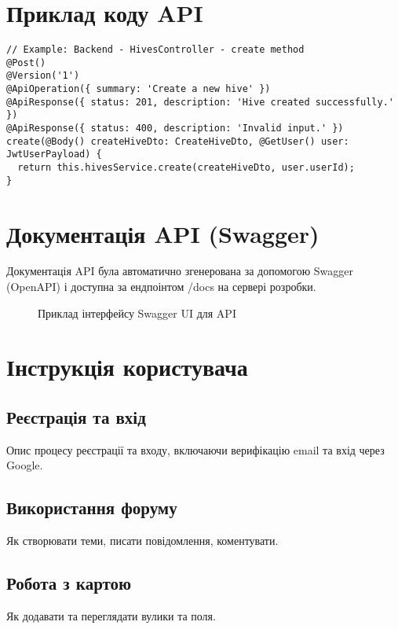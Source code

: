 \appendix %
\chapter{Приклад коду API}
\label{app:api_code_sample}

\begin{verbatim}
// Example: Backend - HivesController - create method
@Post()
@Version('1')
@ApiOperation({ summary: 'Create a new hive' })
@ApiResponse({ status: 201, description: 'Hive created successfully.' })
@ApiResponse({ status: 400, description: 'Invalid input.' })
create(@Body() createHiveDto: CreateHiveDto, @GetUser() user: JwtUserPayload) {
  return this.hivesService.create(createHiveDto, user.userId);
}
\end{verbatim}

\chapter{Документація API (Swagger)}
\label{app:swagger_docs}
Документація API була автоматично згенерована за допомогою Swagger (OpenAPI) і доступна за ендпоінтом /docs на сервері розробки.
\begin{figure}[H]
  \centering
  \caption{Приклад інтерфейсу Swagger UI для API}
  \label{fig:swagger}
\end{figure}

\chapter{Інструкція користувача}
\label{app:user_manual}

\section*{Реєстрація та вхід}
Опис процесу реєстрації та входу, включаючи верифікацію email та вхід через Google.

\section*{Використання форуму}
Як створювати теми, писати повідомлення, коментувати.

\section*{Робота з картою}
Як додавати та переглядати вулики та поля. 